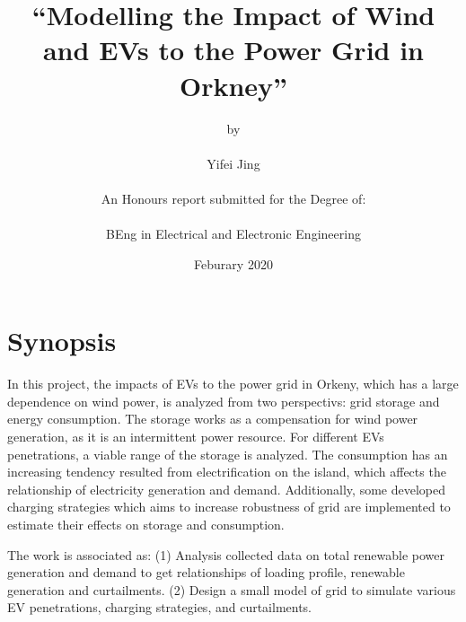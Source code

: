 \documentclass[12pt,a4paper]{report}
\begin{document}
    \onehalfspacing
    \title{\textbf{``Modelling the Impact of Wind and EVs to the Power Grid in Orkney''}}
    \author{by \\ \\ Yifei Jing \\ \\ An Honours report submitted for the Degree of: \\ \\
    BEng in Electrical and Electronic Engineering}
    \date{Feburary 2020}
    \maketitle

    \cleardoublepage  
    \tableofcontents

    \cleardoublepage  
    \listoffigures

    \cleardoublepage  
    \listoftables
    \chapter*{Synopsis}
        In this project, the impacts of EVs to the power grid in Orkeny, which has a large dependence on wind power, is analyzed from two perspectivs: grid storage and energy consumption.
        The storage works as a compensation for wind power generation, as it is an intermittent power resource. For different EVs penetrations, a viable range of the storage is analyzed. The consumption has an increasing tendency resulted from electrification on the island, which affects the relationship of electricity generation and demand. Additionally,
        some developed charging strategies which aims to increase robustness of grid are implemented to estimate their effects on storage and consumption. 

        The work is associated as: (1) Analysis collected data on total renewable power generation and demand to get relationships of loading profile, renewable generation and curtailments.
        (2) Design a small model of grid to simulate various EV penetrations, charging strategies, and curtailments.
\end{document}
